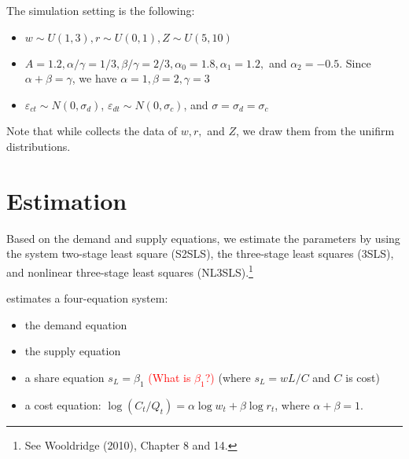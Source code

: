 \documentclass[11pt, a4paper]{article}
\numberwithin{figure}{section}
\theoremstyle{definition}
\newcommand{\0}{\mathbf{0}}
\begin{document}
The simulation setting is the following:
\begin{itemize}
    \item $w \sim U(1,3), r \sim U(0,1), Z \sim U(5, 10)$
    \item $A = 1.2, \alpha/\gamma = 1/3, \beta/\gamma = 2/3, \alpha_0 = 1.8, \alpha_1 = 1.2,$ and $\alpha_2 = -0.5$. Since $\alpha + \beta = \gamma$, we have $\alpha = 1, \beta = 2, \gamma = 3$
    \item $\varepsilon_{ct}\sim N(0,\sigma_d)$, $\varepsilon_{dt} \sim N(0,\sigma_c)$, and $\sigma = \sigma_d = \sigma_c$
    
\end{itemize}
Note that while \citet{hyde1995can} collects the data of $w, r,$ and $Z$, we draw them from the unifirm distributions. 





\section{Estimation}
Based on the demand and supply equations, we estimate the  parameters by using the system two-stage least square (S2SLS), the three-stage least squares (3SLS), and nonlinear three-stage least squares (NL3SLS).\footnote{See Wooldridge (2010), Chapter 8 and 14.}


\citet{hyde1995can} estimates a four-equation system: 
\begin{itemize}
    \item the demand equation
    \item the supply equation
    \item a share equation $s_L = \beta_1$ \textcolor{red}{(What is $\beta_1$?)} (where $s_L = wL/C$ and $C$ is cost)
    \item a cost equation: $\log(C_t/Q_t) = \alpha \log w_t + \beta \log r_t$, where $ \alpha + \beta = 1$.
\end{itemize}
\end{document}
